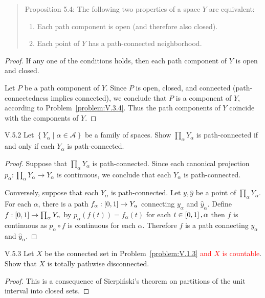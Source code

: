 \begin{quotation}
	Proposition 5.4: The following two properties of a space \(Y\) are equivalent:
	\begin{enumerate}[label={(\arabic*)}]
		\item Each path component is open (and therefore also closed).
		\item Each point of \(Y\) has a path-connected neighborhood.
	\end{enumerate}
\end{quotation}

\begin{proof}
	If any one of the conditions holds, then each path component of \( Y \) is open and closed.

	Let \( P \) be a path component of \( Y \). Since \( P \) is open, closed, and connected (path-connectedness implies connected), we conclude that \( P \) is a component of \( Y \), according to Problem~\ref{problem:V.3.4}. Thus the path components of \(Y\) coincide with the components of \(Y\).
\end{proof}

\begin{problem}{V.5.2}
Let \( \left\{ Y_{\alpha} \mid \alpha \in \mathscr{A} \right\} \) be a family of spaces. Show \( \prod_{\alpha} Y_{\alpha} \) is path-connected if and only if each \( Y_{\alpha} \) is path-connected.
\end{problem}

\begin{proof}
	Suppose that \( \prod_{\alpha} Y_{\alpha} \) is path-connected. Since each canonical projection \( p_{\alpha}: \prod_{\alpha} Y_{\alpha} \to Y_{\alpha} \) is continuous, we conclude that each \( Y_{\alpha} \) is path-connected.

	Conversely, suppose that each \( Y_{\alpha} \) is path-connected. Let \( y, \hat{y} \) be a point of \( \prod_{\alpha} Y_{\alpha} \). For each \( \alpha \), there is a path \( f_{\alpha}: \left\lbrack{0, 1}\right\rbrack \to Y_{\alpha} \) connecting \( y_{\alpha} \) and \( \hat{y}_{\alpha} \). Define \( f: \left\lbrack{0, 1}\right\rbrack \to \prod_{\alpha} Y_{\alpha} \) by \( p_{\alpha}(f(t)) = f_{\alpha}(t) \) for each \( t \in \left\lbrack{0,1}\right\rbrack, \alpha \) then \( f \) is continuous as \( p_{\alpha} \circ f \) is continuous for each \( \alpha \). Therefore \( f \) is a path connecting \( y_{\alpha} \) and \( \hat{y}_{\alpha} \).
\end{proof}

\begin{problem}{V.5.3}
Let \(X\) be the connected set in Problem~\ref{problem:V.1.3} \textcolor{red}{and \( X \) is countable}. Show that \(X\) is totally pathwise disconnected.
\end{problem}

\begin{proof}
	This is a consequence of Sierpiński's theorem on partitions of the unit interval into closed sets.
\end{proof}
